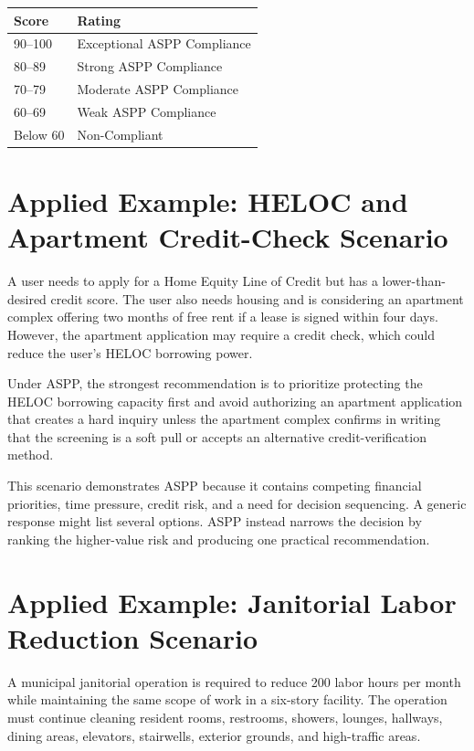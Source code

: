 \documentclass[11pt]{article}
\begin{document}
\begin{longtable}{p{} p{}}
\toprule
\textbf{Score} & \textbf{Rating} \\
\midrule
90--100 & Exceptional ASPP Compliance \\
80--89 & Strong ASPP Compliance \\
70--79 & Moderate ASPP Compliance \\
60--69 & Weak ASPP Compliance \\
Below 60 & Non-Compliant \\
\bottomrule
\end{longtable}

\section{Applied Example: HELOC and Apartment Credit-Check Scenario}

A user needs to apply for a Home Equity Line of Credit but has a lower-than-desired credit score. The user also needs housing and is considering an apartment complex offering two months of free rent if a lease is signed within four days. However, the apartment application may require a credit check, which could reduce the user's HELOC borrowing power.

Under ASPP, the strongest recommendation is to prioritize protecting the HELOC borrowing capacity first and avoid authorizing an apartment application that creates a hard inquiry unless the apartment complex confirms in writing that the screening is a soft pull or accepts an alternative credit-verification method.

This scenario demonstrates ASPP because it contains competing financial priorities, time pressure, credit risk, and a need for decision sequencing. A generic response might list several options. ASPP instead narrows the decision by ranking the higher-value risk and producing one practical recommendation.

\section{Applied Example: Janitorial Labor Reduction Scenario}

A municipal janitorial operation is required to reduce 200 labor hours per month while maintaining the same scope of work in a six-story facility. The operation must continue cleaning resident rooms, restrooms, showers, lounges, hallways, dining areas, elevators, stairwells, exterior grounds, and high-traffic areas.
\end{document}
